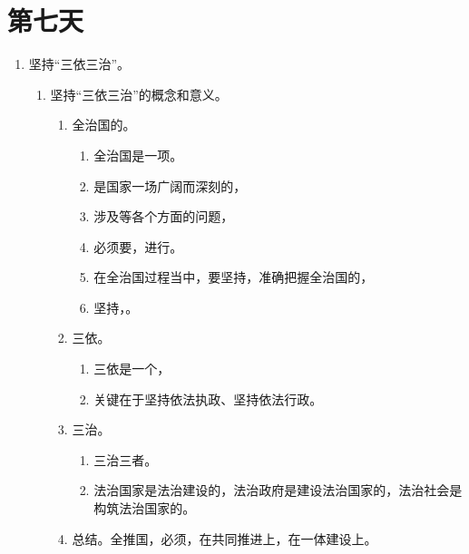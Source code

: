 \section{第七天}
\begin{enumerate}
  \item 坚持“三依三治”。
        \begin{enumerate}
          \item 坚持“三依三治”的概念和意义。
                \begin{enumerate}
                  \item 全治国的。
                        \begin{enumerate}
                          \item 全治国是一项。
                          \item 是国家一场广阔而深刻的，
                          \item 涉及等各个方面的问题，
                          \item 必须要，进行。
                          \item 在全治国过程当中，要坚持，准确把握全治国的，
                          \item 坚持，。
                        \end{enumerate}
                  \item 三依。
                        \begin{enumerate}
                          \item 三依是一个，
                          \item 关键在于坚持依法执政、坚持依法行政。
                        \end{enumerate}
                  \item 三治。
                        \begin{enumerate}
                          \item 三治三者。
                          \item 法治国家是法治建设的，法治政府是建设法治国家的，法治社会是构筑法治国家的。
                        \end{enumerate}
                  \item 总结。全推国，必须，在共同推进上，在一体建设上。

\end{enumerate}
\end{enumerate}
\end{enumerate}
